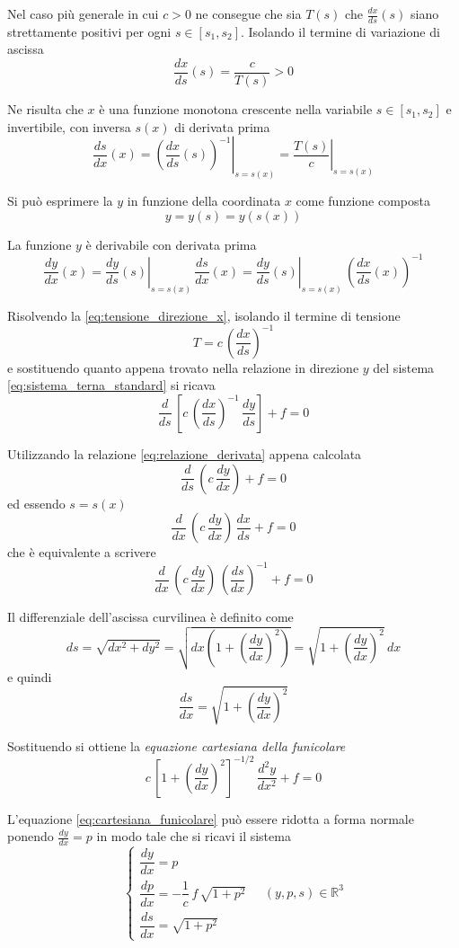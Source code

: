 Nel caso più generale in cui $c>0$ ne consegue che sia $T(s)$ che $\frac{dx}{ds}(s)$ siano strettamente positivi per ogni $s\in[s_1, s_2]$. Isolando il termine di variazione di ascissa 
\[
\dfrac{dx}{ds}(s) = \dfrac{c}{T(s)}	> 0
\]

Ne risulta che $x$ è una funzione monotona crescente nella variabile $s\in[s_1, s_2]$ e invertibile, con inversa $s(x)$ di derivata prima
\[
\dfrac{ds}{dx}(x)	= \left.\left(\dfrac{dx}{ds}(s)\right)^{-1}\right|_{s=s(x)} = \left.\dfrac{T(s)}{c}\right|_{s=s(x)}
\]

Si può esprimere la $y$ in funzione della coordinata $x$ come funzione composta
\[
y = y(s) = y(s(x))	
\]

La funzione $y$ è derivabile con derivata prima 
\begin{equation}
	\label{eq:relazione_derivata}
\dfrac{dy}{dx}(x) = \left.\dfrac{dy}{ds}(s)\right|_{s=s(x)}\,\dfrac{ds}{dx}(x) = \left.\dfrac{dy}{ds}(s)\right|_{s=s(x)}\,\left( \dfrac{dx}{ds}(x)\right)^{-1}
\end{equation}

Risolvendo la \eqref{eq:tensione_direzione_x}, isolando il termine di tensione
\[
T = c\,\left(\dfrac{dx}{ds}\right)^{-1}	
\]
e sostituendo quanto appena trovato nella relazione in direzione $y$ del sistema \eqref{eq:sistema_terna_standard} si ricava
\[
\dfrac{d}{ds}\,\left[c\,\left(\dfrac{dx}{ds}\right)^{-1}\,\dfrac{dy}{ds}\right] + f = 0	
\]

Utilizzando la relazione \eqref{eq:relazione_derivata} appena calcolata 
\[
\dfrac{d}{ds}\,\left(c\,\dfrac{dy}{dx}\right) + f = 0	
\]
ed essendo $s = s(x)$ 
\[
\dfrac{d}{dx}\,\left( c\,\dfrac{dy}{dx}\right)\,\dfrac{dx}{ds} + f = 0	
\]
che è equivalente a scrivere
\[
\dfrac{d}{dx}\,\left( c\,\dfrac{dy}{dx}\right)\,\left(\dfrac{ds}{dx}\right)^{-1} + f = 0
\]

Il differenziale dell'ascissa curvilinea è definito come
\[
 ds = \sqrt{dx^2 + dy^2} = \sqrt{dx\left(1 + \left(\dfrac{dy}{dx}\right)^2\right)} = \sqrt{1 + \left(\dfrac{dy}{dx}\right)^2}\,dx
\]
e quindi
\[
\dfrac{ds}{dx} = \sqrt{1 + \left(\dfrac{dy}{dx}\right)^2}	
\]

Sostituendo si ottiene la \emph{equazione cartesiana della funicolare}
\begin{equation}
	\label{eq:cartesiana_funicolare}
	c\,\left[1+ \left(\dfrac{dy}{dx}\right)^2\right]^{-1/2}\,\dfrac{d^2 y}{dx^2} + f = 0
\end{equation}

L'equazione \eqref{eq:cartesiana_funicolare} può essere ridotta a forma normale ponendo $\frac{dy}{dx} = p$ in modo tale che si ricavi il sistema
\[
\begin{cases}
	\dfrac{dy}{dx} = p\\[1.5ex]	
	\dfrac{dp}{dx} = -\dfrac{1}{c}\,f\,\sqrt{1+p^2}\\[1.5ex]
	\dfrac{ds}{dx} = \sqrt{1+p^2}
\end{cases}\quad (y,p,s)\in\mathbb{R}^3
\]


